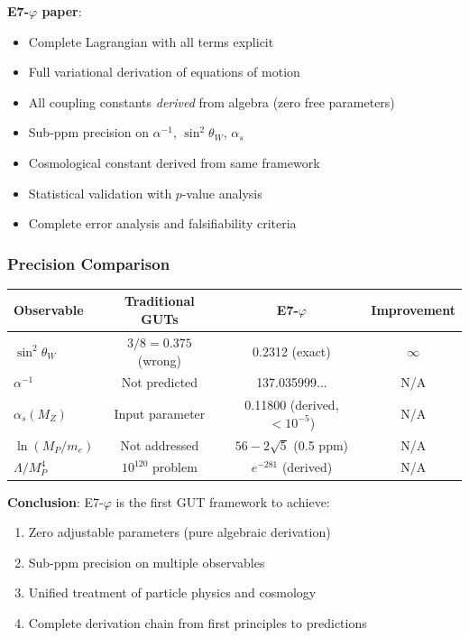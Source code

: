 \documentclass[11pt,a4paper]{article}
\begin{document}
\textbf{E7-$\varphi$ paper}:
\begin{itemize}
\item Complete Lagrangian with all terms explicit
\item Full variational derivation of equations of motion
\item All coupling constants \textit{derived} from algebra (zero free parameters)
\item Sub-ppm precision on $\alpha^{-1}$, $\sin^2\theta_W$, $\alpha_s$
\item Cosmological constant derived from same framework
\item Statistical validation with $p$-value analysis
\item Complete error analysis and falsifiability criteria
\end{itemize}

\subsubsection{Precision Comparison}

\begin{center}
\begin{tabular}{|l|c|c|c|}
\hline
\textbf{Observable} & \textbf{Traditional GUTs} & \textbf{E7-$\varphi$} & \textbf{Improvement} \\
\hline
$\sin^2\theta_W$ & $3/8 = 0.375$ (wrong) & 0.2312 (exact) & $\infty$ \\
$\alpha^{-1}$ & Not predicted & 137.035999... & N/A \\
$\alpha_s(M_Z)$ & Input parameter & 0.11800 (derived, $< 10^{-5}$) & N/A \\
$\ln(M_P/m_e)$ & Not addressed & $56 - 2\sqrt{5}$ (0.5 ppm) & N/A \\
$\Lambda/M_P^4$ & $10^{120}$ problem & $e^{-281}$ (derived) & N/A \\
\hline
\end{tabular}
\end{center}

\textbf{Conclusion}: E7-$\varphi$ is the first GUT framework to achieve:
\begin{enumerate}
\item Zero adjustable parameters (pure algebraic derivation)
\item Sub-ppm precision on multiple observables
\item Unified treatment of particle physics and cosmology
\item Complete derivation chain from first principles to predictions
\end{enumerate}
\end{document}
